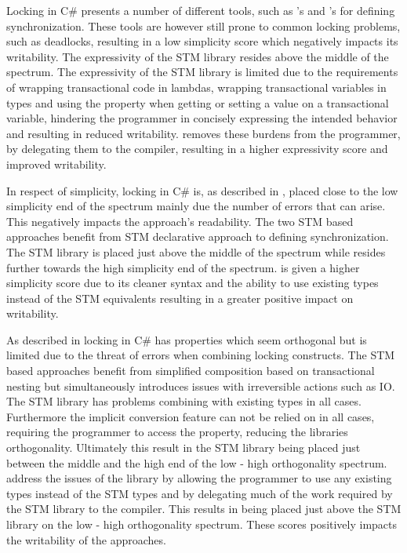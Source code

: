 Locking in C\# presents a number of different tools, such as 's and 's for defining synchronization. These tools are however still prone to common locking problems, such as deadlocks, resulting in a low simplicity score which negatively impacts its writability. The expressivity of the \ac{STM} library resides above the middle of the spectrum. The expressivity of the \ac{STM} library is limited due to the requirements of wrapping transactional code in lambdas, wrapping transactional variables in  types and using the  property when getting or setting a value on a transactional variable, hindering the programmer in concisely expressing the intended behavior and resulting in reduced writability. \stmname removes these burdens from the programmer, by delegating them to the compiler, resulting in a higher expressivity score and improved writability.

In respect of simplicity, locking in C\# is, as described in , placed close to the low simplicity end of the spectrum mainly due the number of errors that can arise. This negatively impacts the approach's readability. The two \ac{STM} based approaches benefit from \ac{STM} declarative approach to defining synchronization. The \ac{STM} library is placed just above the middle of the spectrum while \stmname resides further towards the high simplicity end of the spectrum. \stmname is given a higher simplicity score due to its cleaner syntax and the ability to use existing types instead of the \ac{STM} equivalents resulting in a greater positive impact on writability.

As described in  locking in C\# has properties which seem orthogonal but is limited due to the threat of errors when combining locking constructs. The \ac{STM} based approaches benefit from simplified composition based on transactional nesting but simultaneously introduces issues with irreversible actions such as \ac{IO}. The \ac{STM} library has problems combining with existing types in all cases. Furthermore the implicit conversion feature can not be relied on in all cases, requiring the programmer to access the  property, reducing the libraries orthogonality. Ultimately this result in the \ac{STM} library being placed just between the middle and the high end of the low - high orthogonality spectrum. \stmname address the issues of the  library by allowing the programmer to use any existing types instead of the \ac{STM} types and by delegating much of the work required by the \ac{STM} library to the compiler. This results in \stmname being placed just above the \ac{STM} library on the  low - high orthogonality spectrum. These scores positively impacts the writability of the approaches.

